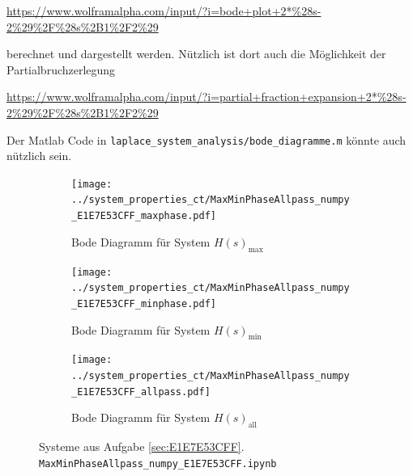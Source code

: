 \url{https://www.wolframalpha.com/input/?i=bode+plot+2*%28s-2%29%2F%28s%2B1%2F2%29}

\noindent  berechnet und dargestellt werden. Nützlich ist dort auch die Möglichkeit
der Partialbruchzerlegung

\url{https://www.wolframalpha.com/input/?i=partial+fraction+expansion+2*%28s-2%29%2F%28s%2B1%2F2%29}

\noindent Der Matlab Code in \texttt{laplace\_system\_analysis/bode\_diagramme.m}
könnte auch nützlich sein.

\clearpage
\begin{figure}[h]
\centering
\begin{subfigure}{0.7\textwidth}
\texttt{[image: ../system\_properties\_ct/MaxMinPhaseAllpass\_numpy\_E1E7E53CFF\_maxphase.pdf]}
\caption{Bode Diagramm für System $H(s)_\mathrm{max}$}
\label{fig:MaxMinPhaseAllpass_numpy_E1E7E53CFF_maxphase}
\end{subfigure}
\begin{subfigure}{0.7\textwidth}
\texttt{[image: ../system\_properties\_ct/MaxMinPhaseAllpass\_numpy\_E1E7E53CFF\_minphase.pdf]}
\caption{Bode Diagramm für System $H(s)_\mathrm{min}$}
\label{fig:MaxMinPhaseAllpass_numpy_E1E7E53CFF_minphase}
\end{subfigure}
\begin{subfigure}{0.7\textwidth}
\texttt{[image: ../system\_properties\_ct/MaxMinPhaseAllpass\_numpy\_E1E7E53CFF\_allpass.pdf]}
\caption{Bode Diagramm für System $H(s)_\mathrm{all}$}
\label{fig:MaxMinPhaseAllpass_numpy_E1E7E53CFF_allpass}
\end{subfigure}
\caption{Systeme aus Aufgabe \ref{sec:E1E7E53CFF}. \texttt{MaxMinPhaseAllpass\_numpy\_E1E7E53CFF.ipynb}}
\label{fig:MaxMinPhaseAllpass_numpy_E1E7E53CFF}
\end{figure}
\clearpage


